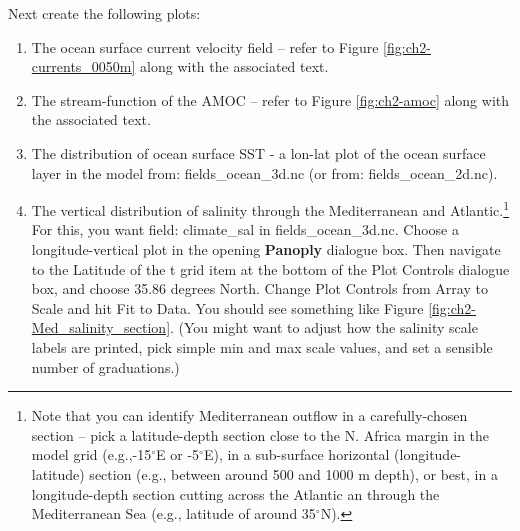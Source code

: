 \newpage

\noindent Next create the following plots:

\begin{enumerate}[noitemsep]
\setlength{\itemindent}{.0in}
\vspace{1mm}
\item The ocean surface current velocity field -- refer to Figure \ref{fig:ch2-currents_0050m} along with the associated text.
\vspace{1mm}
\item The stream-function of the AMOC -- refer to Figure \ref{fig:ch2-amoc} along with the associated text.
\vspace{1mm}
\item The distribution of ocean surface SST - a lon-lat plot of the ocean surface layer in the model from: \textsf{\footnotesize fields\_ocean\_3d.nc} (or from: \textsf{\footnotesize fields\_ocean\_2d.nc}).
\vspace{1mm}
\item The vertical distribution of salinity through the Mediterranean and Atlantic.\footnote{Note that you can identify Mediterranean outflow in a carefully-chosen section -- pick a latitude-depth section close to the N. Africa margin in the model grid (e.g.,-15$^{\circ}$E or -5$^{\circ}$E), in a sub-surface horizontal (longitude-latitude) section (e.g., between around 500 and 1000 m depth), or best, in a longitude-depth section cutting across the Atlantic an through the Mediterranean Sea (e.g., latitude of around 35$^{\circ}$N).} 
\\For this, you want field: \textsf{\footnotesize climate\_sal} in \textsf{\footnotesize fields\_ocean\_3d.nc}. Choose a \textsf{\footnotesize longitude-vertical} plot in the opening \textbf{Panoply} dialogue box. Then navigate to the \textsf{\footnotesize Latitude of the t grid} item at the bottom of the \textsf{\footnotesize Plot Controls} dialogue box, and choose \textsf{\footnotesize 35.86} degrees North. Change \textsf{\footnotesize Plot Controls} from \textsf{\footnotesize Array} to \textsf{\footnotesize Scale} and hit \textsf{\footnotesize Fit to Data}. You should see something like Figure \ref{fig:ch2-Med_salinity_section}. (You might want to adjust how the salinity scale labels are printed, pick simple min and max scale values, and set a sensible number of graduations.)
\end{enumerate}

